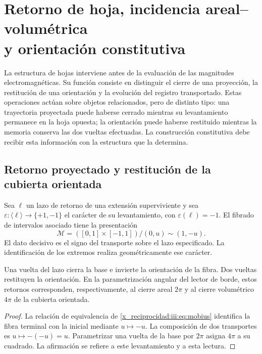

\chapter[Retorno de hoja, incidencia areal--volumétrica y orientación constitutiva]{Retorno de hoja, incidencia areal--volumétrica\\y orientación constitutiva}
\label{x_reciprocidad:iii:sec:hojas}
\label{x_reciprocidad:nuclear:constitutiva-antecedente}

La estructura de hojas interviene antes de la evaluación de las magnitudes
electromagnéticas. Su función consiste en distinguir el cierre de una proyección,
la restitución de una orientación y la evolución del registro transportado.
Estas operaciones actúan sobre objetos relacionados, pero de distinto tipo: una
trayectoria proyectada puede haberse cerrado mientras su levantamiento permanece
en la hoja opuesta; la orientación puede haberse restituido mientras la memoria
conserva las dos vueltas efectuadas. La construcción constitutiva debe recibir
esta información con la estructura que la determina.

\section{Retorno proyectado y restitución de la cubierta orientada}

Sea $\ell$ un lazo de retorno de una extensión superviviente y sea
$\varepsilon:\langle\ell\rangle\to\{+1,-1\}$ el carácter de su
levantamiento, con $\varepsilon(\ell)=-1$. El fibrado de intervalos asociado
tiene la presentación
\begin{equation}
 \mathcal M=([0,1]\times[-1,1])/{(0,u)\sim(1,-u)}.
 \label{x_reciprocidad:iii:eq:mobius}
\end{equation}
El dato decisivo es el signo del transporte sobre el lazo especificado. La
identificación de los extremos realiza geométricamente ese carácter.

\begin{proposition}
Una vuelta del lazo cierra la base e invierte la orientación de la fibra. Dos
vueltas restituyen la orientación. En la parametrización angular del lector de
borde, estos retornos corresponden, respectivamente, al cierre areal $2\pi$ y
al cierre volumétrico $4\pi$ de la cubierta orientada.
\end{proposition}
\begin{proof}
La relación de equivalencia de \eqref{x_reciprocidad:iii:eq:mobius} identifica la fibra terminal
con la inicial mediante $u\mapsto-u$. La composición de dos transportes es
$u\mapsto-(-u)=u$. Parametrizar una vuelta de la base por $2\pi$ asigna $4\pi$
a su cuadrado. La afirmación se refiere a este levantamiento y a esta lectura.
\end{proof}

